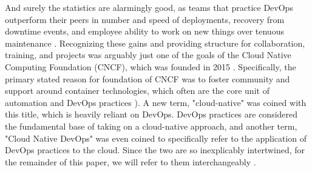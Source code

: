 And surely the statistics are alarmingly good, as teams that practice DevOps outperform their peers in number and speed of deployments, recovery from downtime events, and employee  ability to work on new things over tenuous maintenance \cite{devops-stats-2016}. Recognizing these gains and providing structure for collaboration, training, and projects was arguably just one of the goals of the Cloud Native Computing Foundation (CNCF), which was founded in 2015 \cite{Wikipedia_contributors2021-jt}. Specifically, the primary stated reason for foundation of CNCF was to foster community and support around container technologies, which often are the core unit of automation and DevOps practices \cite{Nishanil_undated-fk}). A new term, "cloud-native" was coined with this title, which is heavily reliant on DevOps. DevOps practices are considered the fundamental base of taking on a cloud-native approach, and another term, "Cloud Native DevOps" \cite{cloud-native-devops-oreilly} was even coined to specifically refer to the application of DevOps practices to the cloud. Since the two are so inexplicably intertwined, for the remainder of this paper, we will refer to them interchangeably \cite{Choice2020-lt}.


